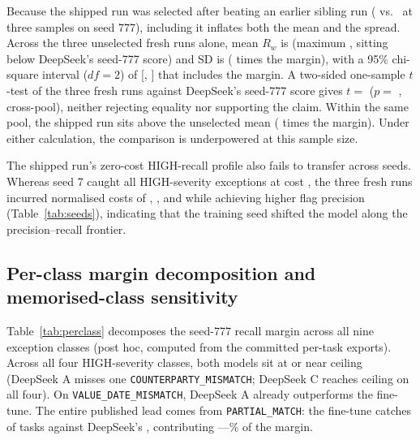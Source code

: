 \documentclass[11pt]{article}
\begin{document}
Because the shipped run was selected after beating an earlier sibling run (\rwChampXthree{} vs.\ \rwSiblingXthree{} at three samples on seed 777), including it inflates both the mean and the spread. Across the three unselected fresh runs alone, mean $R_w$ is \rwFreshMean{} (maximum \freshMax{}, sitting \freshGapToDS{} below DeepSeek's seed-777 score) and SD is \rwFreshSD{} (\freshSDoverMargin{} times the margin), with a 95\% chi-square interval ($df = 2$) of [\rwFreshSDlo{}, \rwFreshSDhi{}] that includes the margin. A two-sided one-sample $t$-test of the three fresh runs against DeepSeek's seed-777 score gives $t = $ \tFresh{} ($p = $ \pFresh{}, cross-pool), neither rejecting equality nor supporting the claim. Within the same pool, the shipped run sits \shipGapFresh{} above the unselected mean (\shipGapOverMargin{} times the margin). Under either calculation, the comparison is underpowered at this sample size.

The shipped run's zero-cost HIGH-recall profile also fails to transfer across seeds. Whereas seed 7 caught all \nHigh{} HIGH-severity exceptions at cost \costShipped{}, the three fresh runs incurred normalised costs of \costSeedMidHigh{}, \costSeedMidLow{}, and \costSeedLow{} while achieving higher flag precision (Table~\ref{tab:seeds}), indicating that the training seed shifted the model along the precision--recall frontier.

\subsection{Per-class margin decomposition and memorised-class sensitivity}
\label{sec:perclass}

\begin{table}[t]
\centering\footnotesize
{\setlength{\tabcolsep}{3.5pt}}
\caption{Post hoc nine-class $R_w$ decomposition on the seed-777 pool (\nBench{} tasks, \nExc{} exceptions). Columns E, A, and C give per-class recall for the shipped fine-tune (five samples), DeepSeek base (one sample), and DeepSeek defined-class (five samples); the last two columns give each class's signed contribution to the published margin (E$-$A, total \pubMargin{}) and own-best-prompt margin (E$'-$C, total \bestPrompt{}).}
\label{tab:perclass}
\end{table}

Table~\ref{tab:perclass} decomposes the seed-777 recall margin across all nine exception classes (post hoc, computed from the committed per-task exports). Across all four HIGH-severity classes, both models sit at or near ceiling (DeepSeek A misses one \texttt{COUNTERPARTY\_MISMATCH}; DeepSeek C reaches ceiling on all four). On \texttt{VALUE\_DATE\_MISMATCH}, DeepSeek A already outperforms the fine-tune. The entire published lead comes from \texttt{PARTIAL\_MATCH}: the fine-tune catches \partialChamp{} of \partialN{} tasks against DeepSeek's \partialDS{}, contributing \partialContrib{}---\partialShare{}\% of the \margin{} margin.
\end{document}
